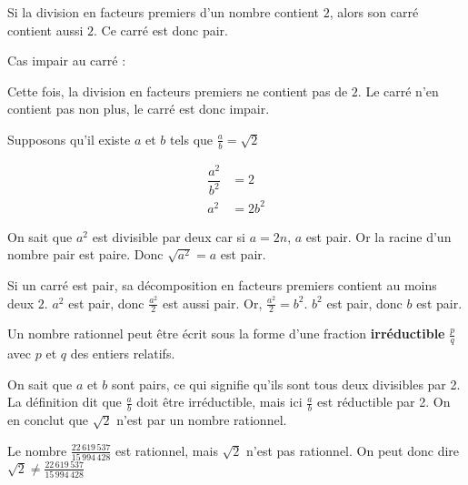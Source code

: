 Si la division en facteurs premiers d'un nombre contient $2$, alors son carré contient aussi $2$. Ce carré est donc pair.
\newline

\par Cas impair au carré :

Cette fois, la division en facteurs premiers ne contient pas de $2$. Le carré n'en contient pas non plus, le carré est donc impair.

Supposons qu'il existe $a$ et $b$ tels que $\frac a b = \sqrt{2}$

\begin{equation*}
	\begin{split}
		\dfrac{a^2}{b^2} &= 2 \\
		a^2 & = 2b^2
	\end{split}
\end{equation*}

On sait que $a^2$ est divisible par deux car si $a = 2n$, $a$ est pair. Or la racine d'un nombre pair est paire. Donc $\sqrt{a^2} = a$ est pair.

Si un carré est pair, sa décomposition en facteurs premiers contient au moins deux $2$. $a^2$ est pair, donc $\frac {a^2} 2$ est aussi pair. Or, $\frac{a^2}{2} = b^2$. $b^2$ est pair, donc $b$ est pair.

\begin{definition}
	Un nombre rationnel peut être écrit sous la forme d'une fraction \textbf{irréductible} $\frac{p}{q}$ avec $p$ et $q$ des entiers relatifs.
\end{definition}

On sait que $a$ et $b$ sont pairs, ce qui signifie qu'ils sont tous deux divisibles par 2. La définition dit que $\frac a b$ doit être irréductible, mais ici $\frac{a}{b}$ est réductible par 2. On en conclut que $\sqrt{2}$ n'est par un nombre rationnel.

Le nombre $\frac{22\,619\,537}{15\,994\,428}$ est rationnel, mais $\sqrt{2}$ n'est pas rationnel. On peut donc dire $\sqrt{2} \neq \frac{22\,619\,537}{15\,994\,428}$